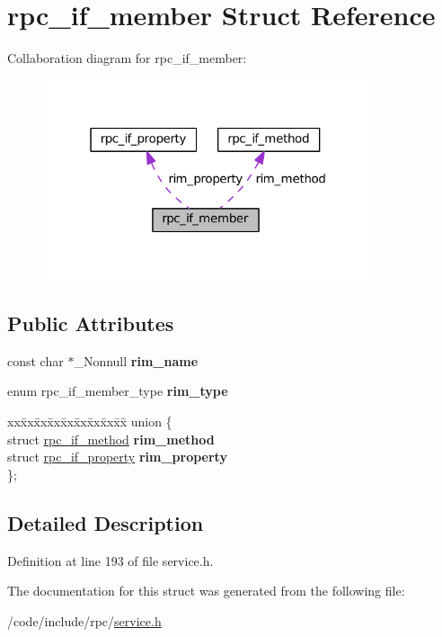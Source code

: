 \hypertarget{structrpc__if__member}{}\section{rpc\+\_\+if\+\_\+member Struct Reference}
\label{structrpc__if__member}


Collaboration diagram for rpc\+\_\+if\+\_\+member\+:
\nopagebreak
\begin{figure}[H]
\begin{center}
\leavevmode
\includegraphics[width=277pt]{structrpc__if__member__coll__graph}
\end{center}
\end{figure}
\subsection*{Public Attributes}
\begin{DoxyCompactItemize}
\item 
\mbox{\label{structrpc__if__member_a656607611d627c965972e4153523287e}} 
const char $\ast$\+\_\+\+Nonnull {\bfseries rim\+\_\+name}
\item 
\mbox{\label{structrpc__if__member_a0ffdb5e81a707932149376d01c716b10}} 
enum rpc\+\_\+if\+\_\+member\+\_\+type {\bfseries rim\+\_\+type}
\item 
\mbox{\label{structrpc__if__member_a7c950b405b6852b3038ae847d0b7e2e0}} 
\begin{tabbing}
xx\=xx\=xx\=xx\=xx\=xx\=xx\=xx\=xx\=\kill
union \{\\
\>struct \hyperlink{structrpc__if__method}{rpc\_if\_method} {\bfseries rim\_method}\\
\>struct \hyperlink{structrpc__if__property}{rpc\_if\_property} {\bfseries rim\_property}\\
\}; \\

\end{tabbing}\end{DoxyCompactItemize}


\subsection{Detailed Description}


Definition at line 193 of file service.\+h.



The documentation for this struct was generated from the following file\+:\begin{DoxyCompactItemize}
\item 
/code/include/rpc/\hyperlink{service_8h}{service.\+h}\end{DoxyCompactItemize}
